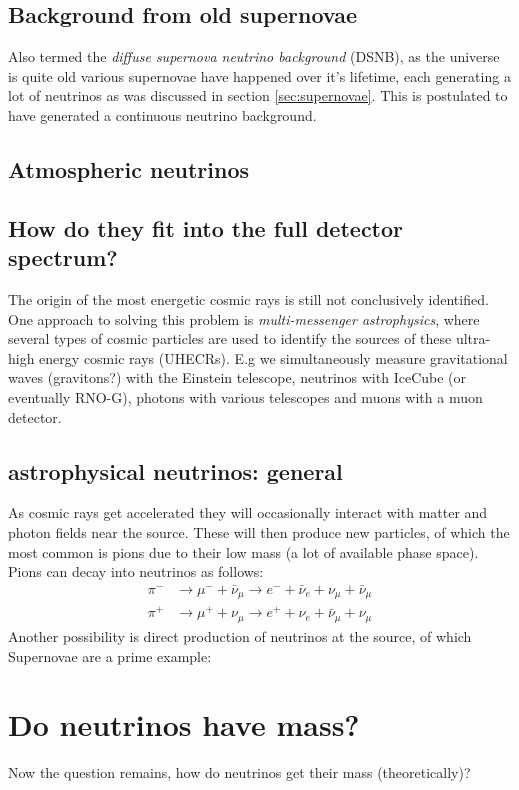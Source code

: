 \documentclass[11pt,a4paper,faculty=we,language=en,doctype=report]{cls/ugent-doc}
\begin{document}
\subsection{Background from old supernovae}
Also termed the \textit{diffuse supernova neutrino background} (DSNB), as the
universe is quite old various supernovae have happened over it's lifetime, each generating
a lot of neutrinos as was discussed in section \ref{sec:supernovae}. 
This is postulated to have generated a continuous neutrino background.
\subsection{Atmospheric neutrinos}

\subsection{How do they fit into the full detector spectrum?}
The origin of the most energetic cosmic rays is still not conclusively
identified. One approach to solving this problem is \textit{multi-messenger
astrophysics}, where several types of cosmic particles are used to identify the
sources of these ultra-high energy cosmic rays (UHECRs). E.g we simultaneously
measure gravitational waves (gravitons?) with the Einstein telescope,
neutrinos with IceCube (or eventually RNO-G), photons with various telescopes
and muons with a muon detector.

\subsection{astrophysical neutrinos: general}
As cosmic rays get accelerated they will occasionally interact with matter
and photon fields near the source. These will then produce new particles,
of which the most common is pions due to their low mass (a lot of available 
phase space). Pions can decay
into neutrinos as follows:
\begin{eqnarray}
	\pi^- &\rightarrow \mu^- + \bar{\nu}_\mu \rightarrow e^- + \bar{\nu}_e + \nu_\mu + \bar{\nu}_\mu\\
	\pi^+ &\rightarrow \mu^+ + \nu_\mu \rightarrow e^+ + \nu_e + \bar{\nu}_\mu + \nu_\mu
\end{eqnarray}
Another possibility is direct production of neutrinos at the source, of which Supernovae are
a prime example:

\section{Do neutrinos have mass?}
Now the question remains, how do neutrinos get their mass (theoretically)?
\end{document}
